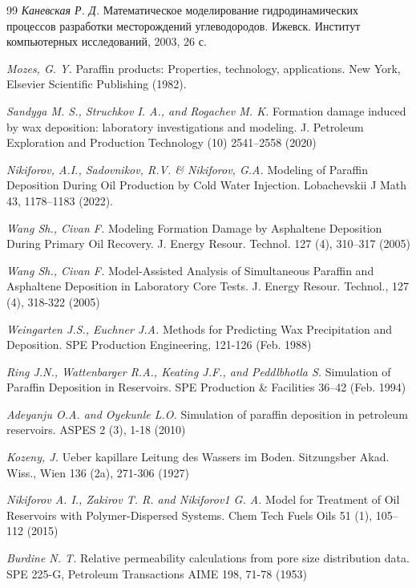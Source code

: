 \documentclass[12pt,twoside,a4paper]{uz_ku}
\begin{document}
\begin{thebibliography}{99}
\textit {Каневская Р. Д.} Математическое моделирование гидродинамических процессов разработки месторождений углеводородов. Ижевск. Институт компьютерных исследований, 2003, 26 с.

\textit {Mozes, G. Y.} Paraffin products: Properties, technology, applications. New York, Elsevier Scientific Publishing (1982).

\textit {Sandyga M. S., Struchkov I. A., and Rogachev M. K.} Formation damage induced by wax deposition: laboratory investigations and modeling. J. Petroleum Exploration and Production Technology (10) 2541–2558 (2020) 

\textit {Nikiforov, A.I., Sadovnikov, R.V. \& Nikiforov, G.A.} Modeling of Paraffin Deposition During Oil Production by Cold Water Injection. Lobachevskii J Math 43, 1178–1183 (2022).

\textit {Wang Sh., Civan F.} Modeling Formation Damage by Asphaltene Deposition During Primary Oil Recovery. J. Energy Resour. Technol. 127 (4), 310–317 (2005) 

\textit {Wang Sh., Civan F.} Model-Assisted Analysis of Simultaneous Paraffin and Asphaltene Deposition in Laboratory Core Tests. J. Energy Resour. Technol., 127 (4), 318-322 (2005) 

\textit {Weingarten J.S., Euchner J.A.} Methods for Predicting Wax Precipitation and Deposition. SPE Production Engineering, 121-126 (Feb. 1988) 

\textit {Ring J.N., Wattenbarger R.A., Keating J.F., and Peddlbhotla S.} Simulation of Paraffin Deposition in Reservoirs. SPE Production \& Facilities 36–42 (Feb. 1994) 

\textit {Adeyanju O.A. and Oyekunle L.O.} Simulation of paraffin deposition in petroleum reservoirs. ASPES 2 (3), 1-18 (2010) 

\textit {Kozeny, J.} Ueber kapillare Leitung des Wassers im Boden. Sitzungsber Akad. Wiss., Wien 136 (2a), 271-306 (1927)

\textit {Nikiforov A. I., Zakirov T. R. and Nikiforov1 G. A.} Model for Treatment of Oil Reservoirs with Polymer-Dispersed Systems. Chem Tech Fuels Oils 51 (1), 105–112 (2015) 

\textit {Burdine N. T.} Relative permeability calculations from pore size distribution data. SPE 225-G, Petroleum Transactions AIME 198, 71-78 (1953) 


\end{thebibliography}
\end{document}
